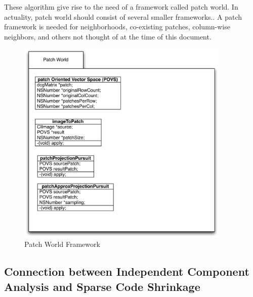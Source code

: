 \documentclass[12pt ]{article}
\begin{document}
These algorithm give rise to the need of a framework called patch world.  In actuality, patch world should consist of several smaller frameworks.. A patch framework is needed for neighborhoods, co-existing patches,  column-wise neighbors, and others not thought of at the time of this document.  
\begin{figure}[htbp] %
   \centering
   \includegraphics[width=4in]{patchWorld.pdf} 
   \caption{Patch World Framework}
   \label{fig-patch-world}
\end{figure}


\subsection{Connection between Independent Component Analysis and Sparse Code Shrinkage}
\label{ica-scs-connection}
\end{document}
